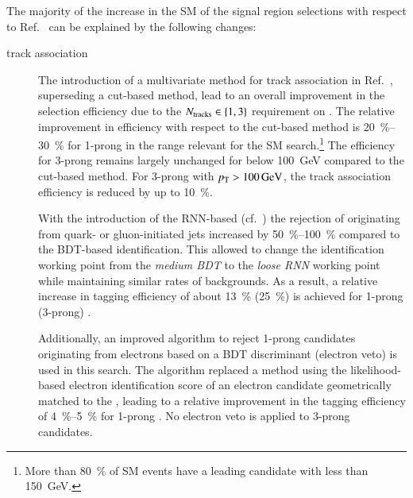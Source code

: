 The majority of the increase in the SM \HH \AccTimesEff of the signal
region selections with respect to Ref.~\cite{HIGG-2016-16-witherratum}
can be explained by the following changes:
\begin{description}

\item[\tauhadvis track association] The introduction of a multivariate
  method for \tauhadvis track association in Ref.~\cite{duschinger},
  superseding a cut-based method, lead to an overall improvement in
  the \tauhadvis selection efficiency due to the
  $N_{\text{tracks}} \in \{1, 3\}$ requirement on \tauhadvis. The relative
  improvement in efficiency with respect to the cut-based method is
  \SIrange{20}{30}{\percent} for 1-prong \tauhadvis in the \tauhadvis
  \pT range relevant for the SM \HH search.\footnote{More than
    \SI{80}{\percent} of SM \HH events have a leading \tauhadvis
    candidate with \pT less than \SI{150}{\GeV}.} The efficiency for
  3-prong \tauhadvis remains largely unchanged for \tauhadvis \pT
  below \SI{100}{\GeV} compared to the cut-based method. For 3-prong
  \tauhadvis with $\pT > \SI{100}{\GeV}$, the track association
  efficiency is reduced by up to \SI{10}{\percent}.

\item[\Tauid] With the introduction of the RNN-based \tauid
  (cf.~) the rejection of \tauhadvis originating from
  quark- or gluon-initiated jets increased by
  \SIrange{50}{100}{\percent} compared to the BDT-based
  identification. This allowed to change the identification working
  point from the \emph{medium BDT} to the \emph{loose RNN} working
  point while maintaining similar rates of \faketauhadvis
  backgrounds. As a result, a relative increase in \tauhadvis tagging
  efficiency of about \SI{13}{\percent} (\SI{25}{\percent}) is
  achieved for 1-prong (3-prong) \tauhadvis.

  Additionally, an improved algorithm to reject 1-prong \tauhadvis
  candidates originating from electrons based on a BDT discriminant
  (electron veto) is used in this search. The algorithm replaced a
  method using the likelihood-based electron identification score of
  an electron candidate geometrically matched to the \tauhadvis,
  leading to a relative improvement in the tagging efficiency of
  \SIrange{4}{5}{\percent} for 1-prong \tauhadvis. No electron veto is
  applied to 3-prong \tauhadvis candidates.



\end{description}
